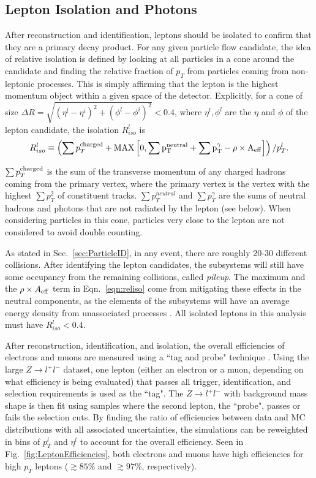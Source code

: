 \subsection{Lepton Isolation and Photons}
\label{sec:zz4lIsolation}

After reconstruction and identification, leptons should be isolated to confirm that they are a primary decay product. For any given particle flow candidate, the idea of relative isolation is defined by looking at all particles in a cone around the candidate and finding the relative fraction of $p_T$ from particles coming from non-leptonic processes. This is simply affirming that the lepton is the highest momentum object within a given space of the detector. Explicitly, for a cone of size $\Delta R = \sqrt{(\eta^l-\eta^i)^2 + (\phi^l-\phi^i)^2} < 0.4$, where $\eta^l,\phi^l$ are the $\eta$ and $\phi$ of the lepton candidate, the isolation $R_{iso}^l$ is
\begin{equation}
\label{eqn:reliso}
R_{iso}^l \equiv \left( \sum p_T^{\rm{charged}} + \rm{MAX}\left[0, \sum p_T^{neutral} + \sum p_T^{\gamma} - \rho\times A_{\rm{eff}}\right] \right) / p_T^{l}.
\end{equation}

$\sum p_T^{\rm{charged}}$ is the sum of the transverse momentum of any charged hadrons coming from the primary vertex, where the primary vertex is the vertex with the highest $\sum p_T^2$ of constituent tracks. $\sum p_T^{neutral}$ and $\sum p_T^{\gamma}$ are the sums of neutral hadrons and photons that are not radiated by the lepton (see below). When considering particles in this cone, particles very close to the lepton are not considered to avoid double counting.

As stated in Sec.~\ref{sec:ParticleID}, in any event, there are roughly 20-30 different collisions. After identifying the lepton candidates, the subsystems will still have some occupancy from the remaining collisions, called \textit{pileup}. The maximum and the $\rho\times A_{\rm{eff}}$ term in Eqn.~\ref{eqn:reliso} come from mitigating these effects in the neutral components, as the elements of the subsystems will have an average energy density from unassociated processes \cite{}. All isolated leptons in this analysis must have $R_{iso}^l < 0.4$.

After reconstruction, identification, and isolation, the overall efficiencies of electrons and muons are measured using a ``tag and probe" technique \cite{}. Using the large $Z\rightarrow l^+l^-$ dataset, one lepton (either an electron or a muon, depending on what efficiency is being evaluated) that passes all trigger, identification, and selection requirements is used as the ``tag". The $Z\rightarrow l^+l^-$ with background mass shape is then fit using samples where the second lepton, the ``probe", passes or fails the selection cuts. By finding the ratio of efficiencies between data and MC distributions with all associated uncertainties, the simulations can be reweighted in bins of $p_T^{l}$ and $\eta^l$ to account for the overall efficiency. Seen in Fig.~\ref{fig:LeptonEfficiencies}, both electrons and muons have high efficiencies for high $p_T$ leptons ($\gtrsim85\%$ and $\gtrsim97\%$, respectively).

